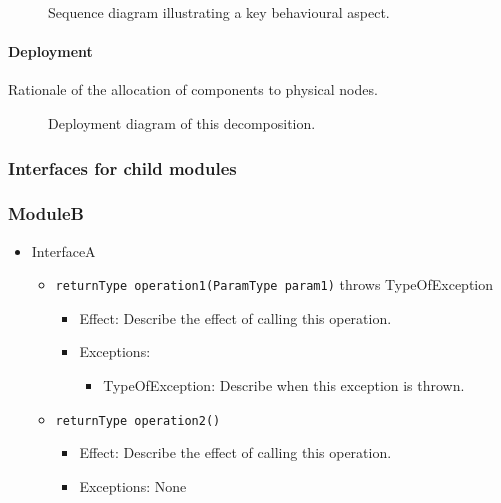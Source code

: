\documentclass[a4paper,10pt]{article}
\begin{document}
\begin{figure}[!htp]
    \centering
    \caption{Sequence diagram illustrating a key behavioural aspect.
        }\label{fig:it1-seq_aspect1}
\end{figure}

\paragraph{Deployment}
Rationale of the allocation of components to physical nodes.

\begin{figure}[!htp]
    \centering
    \caption{Deployment diagram of this decomposition.
        }\label{fig:it1-depl_main}
\end{figure}

\subsubsection{Interfaces for child modules}
\subsubsection*{ModuleB}
\begin{itemize}
    \item InterfaceA
    \begin{itemize}
        \item \texttt{returnType operation1(ParamType param1)} throws TypeOfException
        \begin{itemize}
            \item Effect: Describe the effect of calling this operation.
            \item Exceptions: 
            \begin{itemize}
                \item TypeOfException: Describe when this exception is thrown.
            \end{itemize}
        \end{itemize}

        \item \texttt{returnType operation2()}
        \begin{itemize}
            \item Effect: Describe the effect of calling this operation.
            \item Exceptions: None
         \end{itemize}
    \end{itemize}
\end{itemize}
\end{document}
